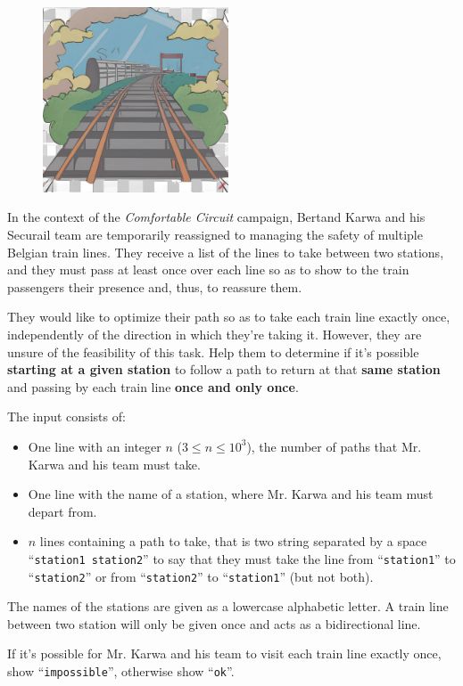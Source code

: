 \problemname{\problemyamlname}

\begin{figure}
	\centering
	\includegraphics[width=5.5cm]{railway.jpg}
\end{figure}

In the context of the \emph{Comfortable Circuit} campaign, Bertand Karwa and his Securail team are temporarily reassigned to managing the safety of multiple Belgian train lines.
They receive a list of the lines to take between two stations, and they must pass at least once over each line so as to show to the train passengers their presence and, thus, to reassure them.

They would like to optimize their path so as to take each train line exactly once, independently of the direction in which they're taking it.
However, they are unsure of the feasibility of this task.
Help them to determine if it's possible \textbf{starting at a given station} to follow a path to return at that \textbf{same station} and passing by each train line \textbf{once and only once}.

\begin{Input}
	The input consists of:
	\begin{itemize}
		\item One line with an integer $n$ ($3 \le n \le 10^3$), the number of paths that Mr. Karwa and his team must take.
		\item One line with the name of a station, where Mr. Karwa and his team must depart from.
		\item $n$ lines containing a path to take, that is two string separated by a space ``\verb|station1 station2|'' to say that they must take the line from ``\verb|station1|'' to ``\verb|station2|'' or from ``\verb|station2|'' to ``\verb|station1|'' (but not both).
	\end{itemize}
	The names of the stations are given as a lowercase alphabetic letter.
	A train line between two station will only be given once and acts as a bidirectional line.
\end{Input}

\begin{Output}
	If it's possible for Mr. Karwa and his team to visit each train line exactly once, show ``\verb|impossible|'', otherwise show ``\verb|ok|''.
\end{Output}

